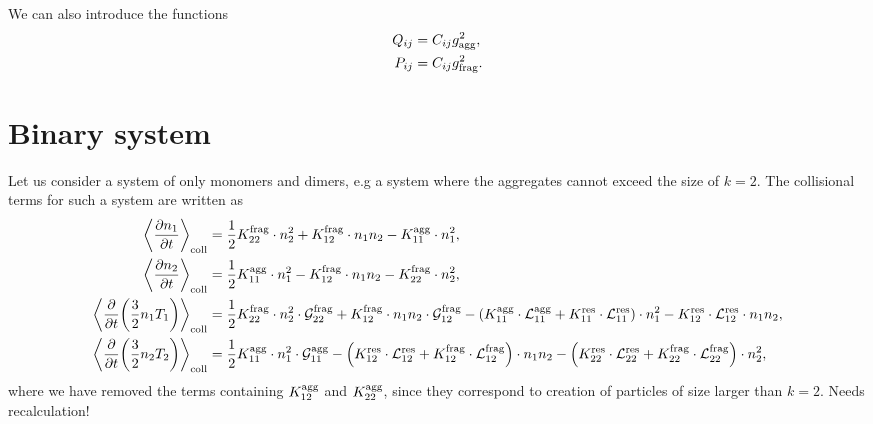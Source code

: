 \documentclass[aps,prl,preprint,groupedaddress,10pt]{revtex4-2}
\begin{document}
We can also introduce the functions
\begin{equation}
    \begin{split}
        Q_{ij} &= C_{ij}g_{\mathrm{agg}}^2,\\
        P_{ij} &= C_{ij}g_{\mathrm{frag}}^2.
    \end{split}
\end{equation}

\section{Binary system}
Let us consider a system of only monomers and dimers, e.g a system where the aggregates
cannot exceed the size of $k=2$. The collisional terms for such a system are written as
\begin{equation}
    \begin{split}
        \ltx{\avg{\pdv{n_1}{t}}}{coll}&=
        \frac{1}{2}\utx{K}{frag}_{22}\cdot n_2^2+\utx{K}{frag}_{12}\cdot n_1n_2
        -\utx{K}{agg}_{11}\cdot n_1^2,\\
        \ltx{\avg{\pdv{n_2}{t}}}{coll}&=\frac{1}{2}\utx{K}{agg}_{11}\cdot n_1^2
        -\utx{K}{frag}_{12}\cdot n_1n_2-\utx{K}{frag}_{22}\cdot n_2^2,\\
        \ltx{\avg{\pdv{t}\pqty{\frac{3}{2}n_1T_1}}}{coll}&=
        \frac{1}{2}\utx{K}{frag}_{22}\cdot n_2^2\cdot\utx{\mathcal{G}}{frag}_{22}+
        \utx{K}{frag}_{12}\cdot n_1n_2\cdot\utx{\mathcal{G}}{frag}_{12}
        -\pqty{\utx{K}{agg}_{11}\cdot \utx{\mathcal{L}}{agg}_{11}
            +\utx{K}{res}_{11}\cdot\utx{\mathcal{L}}{res}_{11}}\cdot n_1^2
        -\utx{K}{res}_{12}\cdot\utx{\mathcal{L}}{res}_{12}\cdot n_1n_2,\\
        \ltx{\avg{\pdv{t}\pqty{\frac{3}{2}n_2T_2}}}{coll}&=
        \frac{1}{2}\utx{K}{agg}_{11}\cdot n_1^2\cdot
        \utx{\mathcal{G}}{agg}_{11}
        -\pqty{\utx{K}{res}_{12}\cdot\utx{\mathcal{L}}{res}_{12}+
            \utx{K}{frag}_{12}\cdot\utx{\mathcal{L}}{frag}_{12}}\cdot n_1n_2
        -\pqty{\utx{K}{res}_{22}\cdot\utx{\mathcal{L}}{res}_{22}+
            \utx{K}{frag}_{22}\cdot\utx{\mathcal{L}}{frag}_{22}}\cdot n_2^2,
    \end{split}
\end{equation}
where we have removed the terms containing $K^{\mathrm{agg}}_{12}$ and $K^{\mathrm{agg}}_{22}$, since they
correspond to creation of particles of size larger than $k=2$. Needs recalculation!
\end{document}
